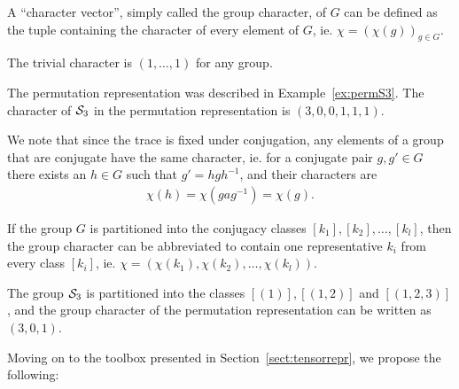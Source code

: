 \begin{notation}
	A ``character vector'', simply called the group character, of $G$ can be defined as the tuple containing the character of every element of $G$, ie. $\chi = (\chi(g))_{g \in G}$.
\end{notation}

\begin{example}
	The trivial character is $(1, \dots, 1)$ for any group.
\end{example}

\begin{example}
	The permutation representation was described in Example~\ref{ex:permS3}. The character of $\mathcal{S}_3$ in the permutation representation is $(3, 0, 0, 1, 1, 1)$.
\end{example}

\begin{remark}
	We note that since the trace is fixed under conjugation, any elements of a group that are conjugate have the same character, ie. for a conjugate pair $g,g' \in G$ there exists an $h \in G$ such that $g' = hgh^{-1}$, and their characters are
	\begin{align*}
		\chi(h) = \chi(gag^{-1}) = \chi(g).
	\end{align*}
\end{remark}

\begin{notation}
	If the group $G$ is partitioned into the conjugacy classes $[k_1], [k_2], \dots, [k_l]$, then the group character can be abbreviated to contain one representative $k_i$ from every class $[k_i]$, ie. $\chi= (\chi(k_1), \chi(k_2), \dots, \chi(k_l))$.
\end{notation}

\begin{example}
	The group $\mathcal{S}_3$ is partitioned into the classes $[(1)], [(1,2)]$ and $[(1,2,3)]$, and the group character of the permutation representation can be written as $(3,0,1)$.
\end{example}

Moving on to the toolbox presented in Section~\ref{sect:tensorrepr}, we propose the following:

